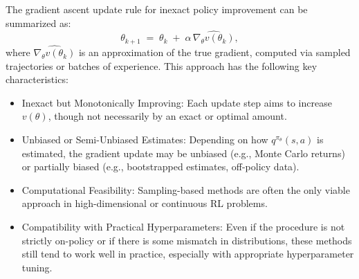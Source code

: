 The gradient ascent update rule for inexact policy improvement can be summarized as:
\begin{equation}
  \theta_{k+1} 
  \;=\; 
  \theta_k \;+\; \alpha \,\widehat{\nabla_\theta v(\theta_k)},
  \label{eq:ga_inexact_update}
\end{equation}
where $\widehat{\nabla_\theta v(\theta_k)}$ is an approximation of the true gradient, computed via sampled trajectories or batches of experience. This approach has the following key characteristics:

\begin{itemize}
  \item Inexact but Monotonically Improving: Each update step aims to increase $v(\theta)$, though not necessarily by an exact or optimal amount.
  \item Unbiased or Semi-Unbiased Estimates: Depending on how $q^{\pi_\theta}(s,a)$ is estimated, the gradient update may be unbiased (e.g., Monte Carlo returns) or partially biased (e.g., bootstrapped estimates, off-policy data).
  \item Computational Feasibility: Sampling-based methods are often the only viable approach in high-dimensional or continuous RL problems.
  \item Compatibility with Practical Hyperparameters: Even if the procedure is not strictly on-policy or if there is some mismatch in distributions, these methods still tend to work well in practice, especially with appropriate hyperparameter tuning.
\end{itemize}

